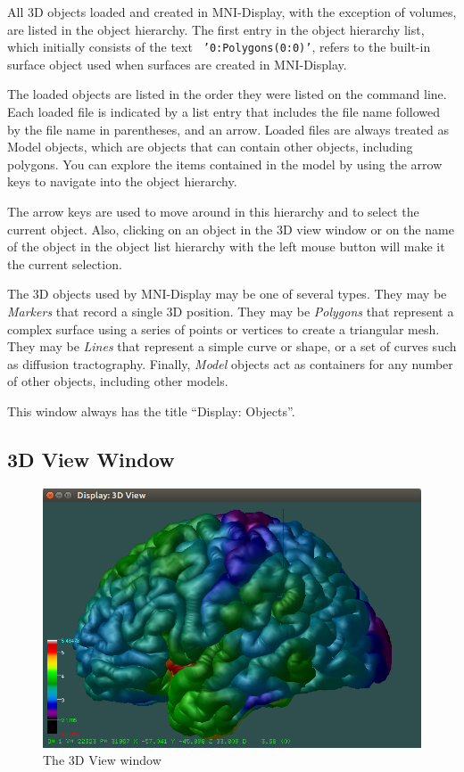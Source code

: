 \documentclass[11pt,letterpaper]{article}
\newcommand{\display}{\mbox{MNI-Display}}
\begin{document}
All 3D objects loaded and created in \display{}, with the exception of
volumes, are listed in the object hierarchy. The first entry in the
object hierarchy list, which initially consists of the text {\tt
  '0:Polygons(0:0)'}, refers to the built-in surface object used when
surfaces are created in \display{}.

The loaded objects are listed in the order they were listed on the
command line. Each loaded file is indicated by a list entry that
includes the file name followed by the file name in parentheses, and
an arrow.  Loaded files are always treated as Model objects, which are
objects that can contain other objects, including polygons. You can
explore the items contained in the model by using the arrow keys to
navigate into the object hierarchy.

The arrow keys are used to move around in this hierarchy and to select
the current object. Also, clicking on an object in the 3D view window
or on the name of the object in the object list hierarchy with the
left mouse button will make it the current selection.

The 3D objects used by \display{} may be one of several types. They
may be {\em Markers} that record a single 3D position. They may be
{\em Polygons} that represent a complex surface using a series of
points or vertices to create a triangular mesh. They may be {\em
  Lines} that represent a simple curve or shape, or a set of curves
such as diffusion tractography. Finally, {\em Model} objects act as
containers for any number of other objects, including other models.

This window always has the title ``Display: Objects''.

\subsection{3D View Window}

\begin{figure}
\centering
\includegraphics[width=0.7\linewidth]{display-3d-view.png}
\caption{The 3D View window}
\label{win3Dview}
\end{figure}
\end{document}
